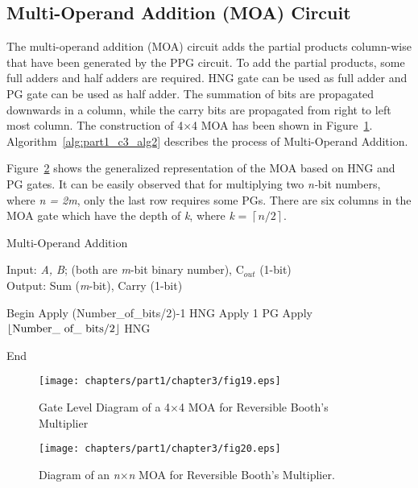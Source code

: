 \subsection{Multi-Operand Addition (MOA) Circuit}

The multi-operand addition (MOA) circuit adds the partial products column-wise that have been generated by the PPG circuit. To add the partial products, some full adders and half adders are required. HNG gate can be used as full adder and PG gate can be used as half adder. The summation of bits are propagated downwards in a column, while the carry bits are propagated from right to left most column. The construction of {4$\times $4} MOA has been shown in Figure~\ref{fig:p1_c3_fig19}. Algorithm~\ref{alg:part1_c3_alg2} describes the process of Multi-Operand Addition. 

Figure~\ref{fig:p1_c3_fig20} shows the generalized representation of the MOA based on HNG and PG gates. It can be easily observed that for multiplying two \textit{n-}bit numbers, where \textit{n = 2m}, only the last row requires some PGs. There are six columns in the MOA gate which have the depth of \textit{k}, where \textit{k} = $\left\lceil n/2\right\rceil $.

\begin{algorithm}[!h]
	\caption{Multi-Operand Addition}
	\label{alg:part1_c3_alg2}
	Input:  {\it A, B}; (both are {\it m}-bit binary number), C${}_{out}$ ({1}-bit)\\
	Output: { { Sum ({\it m}-bit), Carry ({1}-bit)}}
	\begin{algorithmic}[1]
		
		\STATE Begin
		\STATE Apply {(Number\_of\_bits/2)}-{1} HNG
		\STATE Apply 1 PG 
		\ELSE 
		\STATE Apply  $\left\lfloor \textnormal{Number\_ of\_ bits/2}\right\rfloor $ HNG
		\ENDIF
		\ENDFOR
		
		\STATE End
	\end{algorithmic}
\end{algorithm}

\begin{figure}[!tbh]
	\centering
	\texttt{[image: chapters/part1/chapter3/fig19.eps]}
	\caption{Gate Level Diagram of a {4$\times $4} MOA for Reversible Booth's Multiplier}
	\label{fig:p1_c3_fig19}
\end{figure}

\begin{figure}[H]
	\centering
	\texttt{[image: chapters/part1/chapter3/fig20.eps]}
	\caption{Diagram of an \textit{n$\times $n} MOA for Reversible Booth's Multiplier.}
	\label{fig:p1_c3_fig20}
\end{figure}

